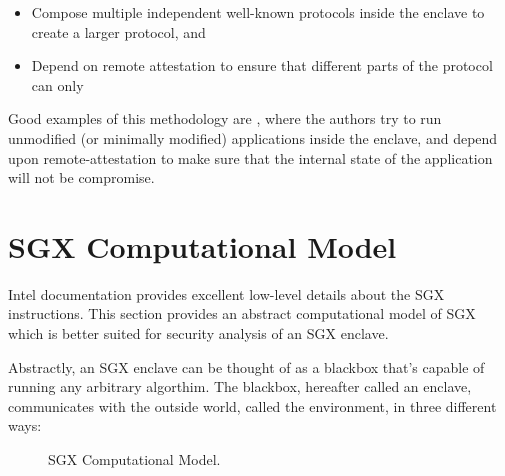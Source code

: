 \documentclass[11pt]{article}
\newcommand{\env}{\textsf{environment}}
\begin{document}
  \begin{itemize}
    \item Compose multiple independent well-known protocols inside the
      enclave to create a larger protocol, and

    \item Depend on remote attestation to ensure that different parts
      of the protocol can only
  \end{itemize}

  Good examples of this methodology are \cite{Haven, Graphene, Scone},
  where the authors try to run unmodified (or minimally modified)
  applications inside the enclave, and depend upon remote-attestation
  to make sure that the internal state of the application will not be
  compromise.

  \section{SGX Computational Model}
  Intel documentation\cite{intelsdm} provides excellent low-level
  details about the SGX instructions. This section provides an
  abstract computational model of SGX which is better suited for
  security analysis of an SGX enclave.

  Abstractly, an SGX enclave can be thought of as a blackbox that's
  capable of running any arbitrary algorthim. The blackbox, hereafter
  called an enclave, communicates with the outside world, called the
  \env, in three different ways:

  \begin{figure}[h]
  \centering
  
  \caption{SGX Computational Model.}
  \label{fig:model}
  \end{figure}
\end{document}
